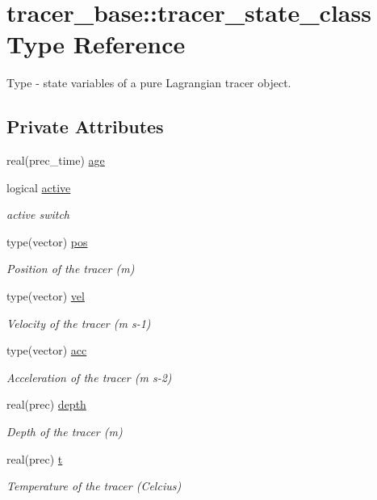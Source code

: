 \hypertarget{structtracer__base_1_1tracer__state__class}{}\section{tracer\+\_\+base\+:\+:tracer\+\_\+state\+\_\+class Type Reference}
\label{structtracer__base_1_1tracer__state__class}


Type -\/ state variables of a pure Lagrangian tracer object.  


\subsection*{Private Attributes}
\begin{DoxyCompactItemize}
\item 
real(prec\+\_\+time) \mbox{\hyperlink{structtracer__base_1_1tracer__state__class_a23ee8b78946c85f5e079ad0f5fc08b29}{age}}
\item 
logical \mbox{\hyperlink{structtracer__base_1_1tracer__state__class_aeb73b96dfbc525803fab32c3d3ae3ab8}{active}}
\begin{DoxyCompactList}\small\item\em active switch \end{DoxyCompactList}\item 
type(vector) \mbox{\hyperlink{structtracer__base_1_1tracer__state__class_a3c966719f4a6961697a7e939694cb550}{pos}}
\begin{DoxyCompactList}\small\item\em Position of the tracer (m) \end{DoxyCompactList}\item 
type(vector) \mbox{\hyperlink{structtracer__base_1_1tracer__state__class_a46296517bb40271bcff0fe9c85024e7c}{vel}}
\begin{DoxyCompactList}\small\item\em Velocity of the tracer (m s-\/1) \end{DoxyCompactList}\item 
type(vector) \mbox{\hyperlink{structtracer__base_1_1tracer__state__class_a5a66d6eaa3610d07fe073a04727ffb6e}{acc}}
\begin{DoxyCompactList}\small\item\em Acceleration of the tracer (m s-\/2) \end{DoxyCompactList}\item 
real(prec) \mbox{\hyperlink{structtracer__base_1_1tracer__state__class_a87200472c310a7b3f95653cd43eda82f}{depth}}
\begin{DoxyCompactList}\small\item\em Depth of the tracer (m) \end{DoxyCompactList}\item 
real(prec) \mbox{\hyperlink{structtracer__base_1_1tracer__state__class_a9c46c74fa11fc342836842e435b51343}{t}}
\begin{DoxyCompactList}\small\item\em Temperature of the tracer (Celcius) \end{DoxyCompactList}\end{DoxyCompactItemize}


